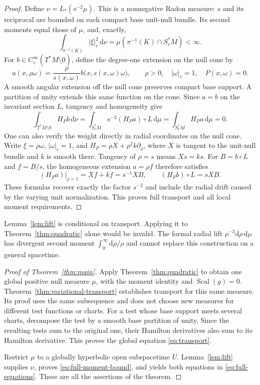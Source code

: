 \documentclass[11pt,a4paper]{article}
\numberwithin{equation}{section}
\newcommand{\Scal}{\operatorname{Scal}}
\newcommand{\dd}{\mathrm d}
\newcommand{\f}[2]{\frac{#1}{#2}}
\theoremstyle{definition}
\begin{document}
\begin{proof}
Define $\nu=L_*(s^{-2}\mu)$. This is a nonnegative Radon measure: $s$ and its reciprocal are bounded on each compact base unit-null bundle. Its second moments equal those of $\mu$, and, exactly,
\begin{equation*}
\int_{\pi^{-1}(K)}|\xi|_r^2\,\dd\nu=\mu(\pi^{-1}(K)\cap S_r^*M)<\infty.
\end{equation*}
For $b\in C_c^\infty(T^*M\setminus0)$, define the degree-one
extension on the null cone by
\begin{equation*}
a(x,\rho\omega)=\f{\rho}{s(x,\omega)}
 b\bigl(x,s(x,\omega)\omega\bigr),
\qquad \rho>0,\quad |\omega|_r=1,\quad P(x,\omega)=0.
\end{equation*}
A smooth angular extension off the null cone preserves compact base
support. A partition of unity extends this same function on the cone.
Since $a=b$ on the invariant section $L$, tangency and homogeneity give
\begin{equation*}
\int_{T^*M\setminus 0}H_Pb\,\dd\nu
=\int_{S_r^*M}s^{-2}(H_Pa)\circ L\,\dd\mu
=\int_{S_r^*M}H_Pa\,\dd\mu=0.
\end{equation*}
One can also verify the weight directly in radial coordinates on the
null cone. Write $\xi=\rho\omega$, $|\omega|_r=1$, and
$H_P=\rho X+\rho^2 k\partial_\rho$, where $X$ is tangent to the
unit-null bundle and $k$ is smooth there. Tangency of $\rho=s$ means
$Xs=ks$. For $B=b\circ L$ and $f=B/s$, the homogeneous extension
$a=\rho f$ therefore satisfies
\begin{equation*}
 (H_Pa)|_{\rho=1}=Xf+kf=s^{-1}XB,
 \qquad (H_Pb)\circ L=sXB.
\end{equation*}
These formulas recover exactly the factor $s^{-2}$ and include the
radial drift caused by the varying unit normalization.
This proves full transport and all local moment requirements.
\end{proof}

Lemma~\ref{lem:lift} is conditional on transport. Applying it to Theorem~\ref{thm:quadratic} alone would be invalid. The formal radial lift $\rho^{-3}\dd\rho\,\dd\mu$ has divergent second moment $\int_0^\infty\dd\rho/\rho$ and cannot replace this construction on a general spacetime.


\begin{proof}[Proof of Theorem~\ref{thm:main}]
Apply Theorem~\ref{thm:quadratic} to obtain one global positive null
measure $\mu$, with the moment identity and $\Scal(g)=0$.
Theorem~\ref{thm:variational-transport} establishes transport for this
same measure. Its proof uses the same subsequence and does not choose
new measures for different test functions or charts. For a test whose
base support meets several charts, decompose the test by a smooth base
partition of unity. Since the resulting tests sum to the original one,
their Hamilton derivatives also sum to its Hamilton derivative.
This proves the global equation \eqref{eq:transport}.

Restrict $\mu$ to a globally hyperbolic open subspacetime $U$.
Lemma~\ref{lem:lift} supplies $\nu$, proves
\eqref{eq:full-moment-bound}, and yields both equations in
\eqref{eq:full-equations}. These are all the assertions of the theorem.
\end{proof}
\end{document}
